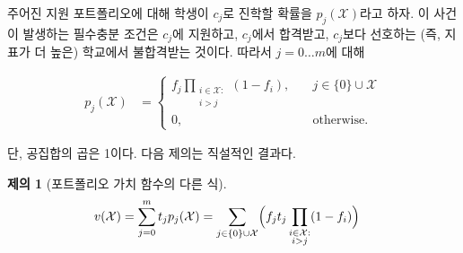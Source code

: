 \documentclass[11pt]{article} %
\newif\ifen
\newtheorem{proposition}{Proposition}
\theoremstyle{definition}
\newtheorem{proposition}{제의}
\theoremstyle{definition}
\begin{document}
\ifen
Given an application portfolio, let $p_j(\mathcal{X})$ denote the probability that the student attends $c_j$. This occurs if and only if she \emph{applies} to $c_j$, is \emph{admitted} to $c_j$, and is \emph{rejected} from any school she prefers to $c_j$; that is, any school with higher index. Hence, for $j= 0\dots m$,
\else
주어진 지원 포트폴리오에 대해 학생이 $c_j$로 진학할 확률을 $p_j(\mathcal{X})$라고 하자. 이 사건이 발생하는 필수충분 조건은 $c_j$에 지원하고, $c_j$에서 합격받고, $c_j$보다 선호하는 (즉, 지표가 더 높은) 학교에서 불합격받는 것이다. 따라서  $j= 0\dots m$에 대해
\fi
\begin{align}
p_j(\mathcal{X}) &= 
\begin{cases}
\displaystyle f_j  \prod_{\substack{i \in \mathcal{X}: \\ i > j}} (1 - f_{i}), \quad & j \in \{0\}\cup\mathcal{X}\\
0, \quad & \text{\ifen otherwise\else otherwise.\fi}
\end{cases} 
\end{align}
\ifen
where the empty product equals one. The following proposition follows immediately.
\else
단, 공집합의 곱은 1이다. 다음 제의는 직설적인 결과다.
\fi

\begin{proposition}[\ifen Closed form of portfolio valuation function\else 포트폴리오 가치 함수의 다른 식\fi]
\begin{align}
v(\mathcal{X}) &= \sum_{j=0}^m t_j p_j(\mathcal{X}) = \sum_{j\in\{0\}\cup\mathcal{X}} \Bigl( f_j t_j \prod_{\substack{i \in \mathcal{X}: \\ i > j}} (1 - f_{i}) \Bigr)  \label{closedformportfoliovaluationX}%
\end{align}
\end{proposition}
\end{document}
